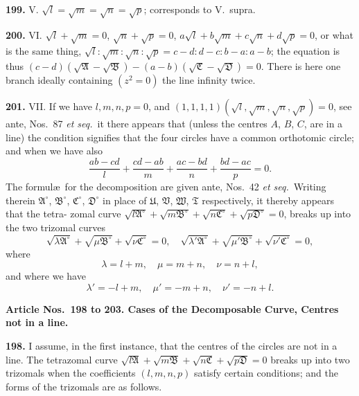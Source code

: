 \documentclass[12pt,a4paper]{article}
\theoremstyle{definition}
\begin{document}
\noindent\textbf{199.} V. $\sqrt{l} = \sqrt{m} = \sqrt{n} = \sqrt{p}$; corresponds to V.\ supra.

\noindent\textbf{200.} VI. $\sqrt{l} + \sqrt{m} = 0$, $\sqrt{n} + \sqrt{p} = 0$, $a\sqrt{l} + b\sqrt{m} + c\sqrt{n} + d\sqrt{p} = 0$,
or what is the same thing, $\sqrt{l} : \sqrt{m} : \sqrt{n} : \sqrt{p} = c - d : d - c : b - a : a - b$;
the equation is thus $(c - d)(\sqrt{\mathfrak{A}} - \sqrt{\mathfrak{B}}) - (a - b)(\sqrt{\mathfrak{C}} - \sqrt{\mathfrak{D}}) = 0$.
There is here one branch ideally containing $(z^2 = 0)$ the line infinity twice.

\newpage
\noindent\textbf{201.} VII. If we have $l, m, n, p = 0$, and $(1, 1, 1, 1)(\sqrt{l}, \sqrt{m}, \sqrt{n}, \sqrt{p}) = 0$,
see ante, Nos.~87 \textit{et seq.}\ it there appears that (unless the centres $A$, $B$, $C$, are in
a line) the condition signifies that the four circles have a common orthotomic circle;
and when we have also
\[
\frac{ab - cd}{l} + \frac{cd - ab}{m} + \frac{ac - bd}{n} + \frac{bd - ac}{p} = 0.
\]
The formul\ae\ for the decomposition are given ante, Nos.~42 \textit{et seq.}\ Writing therein
$\mathfrak{A}^\circ$, $\mathfrak{B}^\circ$, $\mathfrak{C}^\circ$, $\mathfrak{D}^\circ$ in place of $\mathfrak{U}$, $\mathfrak{V}$, $\mathfrak{W}$, $\mathfrak{T}$ respectively, it thereby appears that the tetra-
zomal curve $\sqrt{l\mathfrak{A}^\circ} + \sqrt{m\mathfrak{B}^\circ} + \sqrt{n\mathfrak{C}^\circ} + \sqrt{p\mathfrak{D}^\circ} = 0$, breaks up into the two trizomal curves
\[
\sqrt{\lambda\mathfrak{A}^\circ} + \sqrt{\mu\mathfrak{B}^\circ} + \sqrt{\nu\mathfrak{C}^\circ} = 0, \quad
\sqrt{\lambda'\mathfrak{A}^\circ} + \sqrt{\mu'\mathfrak{B}^\circ} + \sqrt{\nu'\mathfrak{C}^\circ} = 0,
\]
where
\[
\lambda = l + m, \quad \mu = m + n, \quad \nu = n + l,
\]
and where we have
\[
\lambda' = -l + m, \quad \mu' = -m + n, \quad \nu' = -n + l.
\]

\vspace{0.5em}
\noindent\textbf{Article Nos.~198 to 203. Cases of the Decomposable Curve, Centres not in a line.}

\vspace{0.3em}
\noindent\textbf{198.} I assume, in the first instance, that the centres of the circles are not in
a line. The tetrazomal curve $\sqrt{l\mathfrak{A}} + \sqrt{m\mathfrak{B}} + \sqrt{n\mathfrak{C}} + \sqrt{p\mathfrak{D}} = 0$ breaks up into
two trizomals when the coefficients $(l, m, n, p)$ satisfy certain conditions; and the forms
of the trizomals are as follows.
\end{document}
